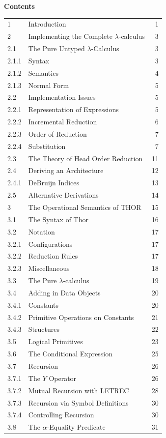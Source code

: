 \clearpage
\thispagestyle{plain}
\begin{center}
\textbf{Contents}
\end{center}

\vspace{0.3in}

\begin{tabular}{@{}p{0.75in}p{4.35in}r@{}}
1 & Introduction & 1\\[0.3em]
2 & Implementing the Complete \(\lambda\)-calculus & 3\\
2.1 & The Pure Untyped \(\lambda\)-Calculus & 3\\
2.1.1 & Syntax & 3\\
2.1.2 & Semantics & 4\\
2.1.3 & Normal Form & 5\\
2.2 & Implementation Issues & 5\\
2.2.1 & Representation of Expressions & 5\\
2.2.2 & Incremental Reduction & 6\\
2.2.3 & Order of Reduction & 7\\
2.2.4 & Substitution & 7\\
2.3 & The Theory of Head Order Reduction & 11\\
2.4 & Deriving an Architecture & 12\\
2.4.1 & DeBruijn Indices & 13\\
2.5 & Alternative Derivations & 14\\[0.3em]
3 & The Operational Semantics of THOR & 15\\
3.1 & The Syntax of Thor & 16\\
3.2 & Notation & 17\\
3.2.1 & Configurations & 17\\
3.2.2 & Reduction Rules & 17\\
3.2.3 & Miscellaneous & 18\\
3.3 & The Pure \(\lambda\)-calculus & 19\\
3.4 & Adding in Data Objects & 20\\
3.4.1 & Constants & 20\\
3.4.2 & Primitive Operations on Constants & 21\\
3.4.3 & Structures & 22\\
3.5 & Logical Primitives & 23\\
3.6 & The Conditional Expression & 25\\
3.7 & Recursion & 26\\
3.7.1 & The \(Y\) Operator & 26\\
3.7.2 & Mutual Recursion with LETREC & 28\\
3.7.3 & Recursion via Symbol Definitions & 30\\
3.7.4 & Controlling Recursion & 30\\
3.8 & The \(\alpha\)-Equality Predicate & 31\\
\end{tabular}

